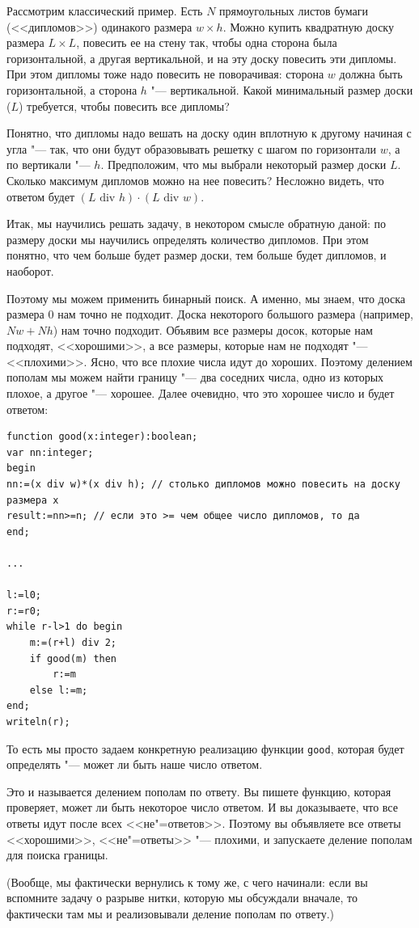\documentclass[a4paper,10pt]{problems}
\begin{document}
Рассмотрим классический пример. 
Есть $N$ прямоугольных листов бумаги (<<дипломов>>) одинакого размера 
$w\times h$. Можно купить квадратную доску размера $L\times L$, 
повесить ее на стену так, чтобы одна сторона была горизонтальной,
а другая вертикальной, и на эту доску повесить эти дипломы. При этом
дипломы тоже надо повесить не поворачивая: сторона $w$ должна быть
горизонтальной, а сторона $h$ "--- вертикальной.
Какой минимальный размер доски ($L$) требуется, чтобы повесить все дипломы?

Понятно, что дипломы надо вешать на доску один вплотную к другому 
начиная с угла "--- так, что они будут образовывать решетку с шагом
по горизонтали $w$, а по вертикали "--- $h$.
Предположим, что мы выбрали некоторый размер доски $L$.
Сколько максимум дипломов можно на нее повесить?
Несложно видеть, что ответом будет $(L\mbox{ div }h)\cdot(L\mbox{ div }w)$.

Итак, мы научились решать задачу, в некотором смысле обратную даной:
по размеру доски мы научились определять количество дипломов.
При этом понятно, что чем больше будет размер доски, тем больше будет
дипломов, и наоборот. 

Поэтому мы можем применить бинарный поиск. 
А именно, мы знаем, что доска размера 0 нам точно не подходит.
Доска некоторого большого размера (например, $Nw+Nh$) нам точно подходит.
Объявим все размеры досок, которые нам подходят, <<хорошими>>,
а все размеры, которые нам не подходят "--- <<плохими>>.
Ясно, что все плохие числа идут до хороших.
Поэтому делением пополам мы можем найти границу "--- два соседних числа,
одно из которых плохое, а другое "--- хорошее.
Далее очевидно, что это хорошее число и будет ответом:
\begin{codesampleo}\begin{verbatim}
function good(x:integer):boolean;
var nn:integer;
begin
nn:=(x div w)*(x div h); // столько дипломов можно повесить на доску размера x
result:=nn>=n; // если это >= чем общее число дипломов, то да
end;

...

l:=l0;
r:=r0;  
while r-l>1 do begin    
    m:=(r+l) div 2;
    if good(m) then
        r:=m
    else l:=m;
end;
writeln(r);
\end{verbatim}
\end{codesampleo}

То есть мы просто задаем конкретную реализацию функции \verb`good`,
которая будет определять "--- может ли быть наше число ответом.

Это и называется делением пополам по ответу. 
Вы пишете функцию, которая проверяет, может ли быть некоторое число ответом.
И вы доказываете, что все ответы идут после всех <<не"=ответов>>.
Поэтому вы объявляете все ответы <<хорошими>>, <<не"=ответы>> "--- плохими,
и запускаете деление пополам для поиска границы.

(Вообще, мы фактически вернулись к тому же, с чего начинали: если вы вспомните
задачу о разрыве нитки, которую мы обсуждали вначале, то фактически там мы
и реализовывали деление пополам по ответу.)

\end{document}
